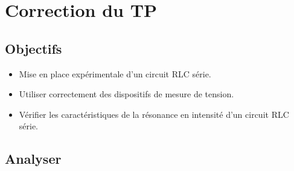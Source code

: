 \documentclass[a4paper, 11pt, final, garamond]{book}
\begin{document}
\setcounter{chapter}{11}

\chapter{Correction du TP}
\section{Objectifs}

\begin{itemize}
    \item Mise en place expérimentale d'un circuit RLC série. 
    \item Utiliser correctement des dispositifs de mesure de tension. 
    \item Vérifier les caractéristiques de la résonance en intensité d'un
        circuit RLC série. 
\end{itemize}

\section{Analyser}
\end{document}
